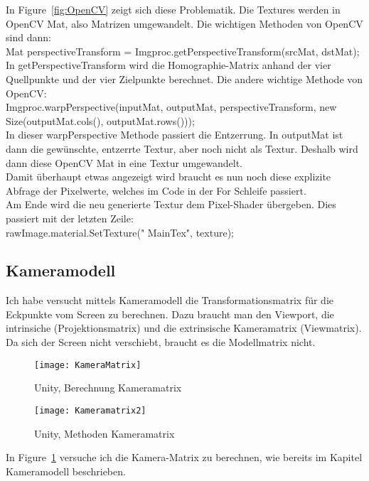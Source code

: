 In Figure~\ref{fig:OpenCV} zeigt sich diese Problematik. Die Textures werden in OpenCV Mat, also Matrizen umgewandelt. Die wichtigen Methoden von OpenCV sind dann: \\  
Mat perspectiveTransform = Imgproc.getPerspectiveTransform(srcMat, dstMat); \\
In getPerspectiveTransform wird die Homographie-Matrix anhand der vier Quellpunkte und der vier Zielpunkte berechnet. Die andere wichtige Methode von OpenCV: \\ 
 Imgproc.warpPerspective(inputMat, outputMat, perspectiveTransform, new Size(outputMat.cols(), outputMat.rows())); \\ In dieser warpPerspective Methode passiert die Entzerrung. In outputMat ist dann die gewünschte, entzerrte Textur, aber noch nicht als Textur. Deshalb wird dann diese OpenCV Mat in eine Textur umgewandelt. \\ Damit überhaupt etwas angezeigt wird braucht es nun noch diese explizite Abfrage der Pixelwerte, welches im Code in der For Schleife passiert.  \\ Am Ende wird die neu generierte Textur dem Pixel-Shader übergeben. Dies passiert mit der letzten Zeile: \\
 rawImage.material.SetTexture(" MainTex", texture);

\subsection{Kameramodell}
Ich habe versucht mittels Kameramodell die Transformationsmatrix für die Eckpunkte vom Screen zu berechnen. Dazu braucht man den Viewport, die intrinsiche (Projektionsmatrix) und die extrinsische Kameramatrix (Viewmatrix). Da sich der Screen nicht verschiebt, braucht es die Modellmatrix nicht.

\begin{figure}[H]
	\texttt{[image: KameraMatrix]}
	\caption{Unity, Berechnung Kameramatrix}
	\label{fig:Berechnung Kameramatrix}
\end{figure}

\begin{figure}[H]
	\texttt{[image: Kameramatrix2]}
	\caption{Unity, Methoden Kameramatrix}
	\label{fig:Kameramatrix Methoden}
\end{figure}

In Figure~\ref{fig:Berechnung Kameramatrix} versuche ich die Kamera-Matrix zu berechnen, wie bereits im Kapitel Kameramodell beschrieben.

